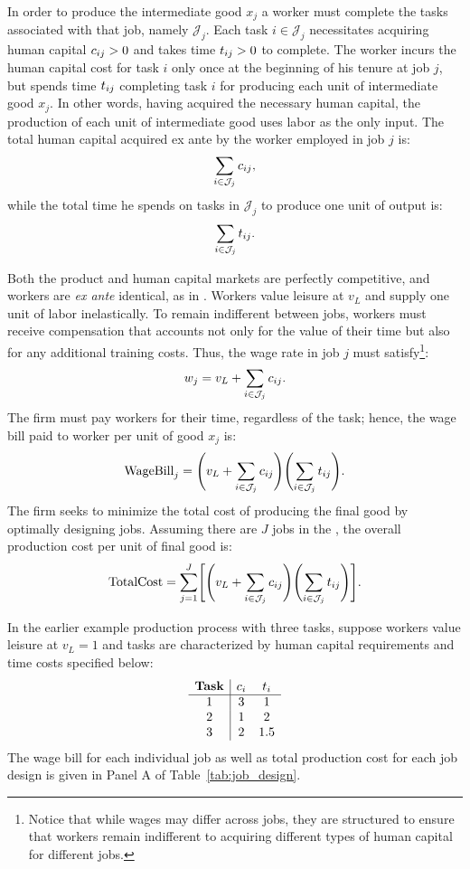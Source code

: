 \documentclass{article}
\theoremstyle{plain}
\theoremstyle{plain}
\begin{document}
In order to produce the intermediate good $x_j$ a worker must complete the tasks associated with that job, namely $\mathcal{J}_j$.
Each task $i \in \mathcal{J}_j$ necessitates acquiring human capital $c_{ij} > 0$ and takes time $t_{ij} > 0$ to complete.
The worker incurs the human capital cost for task $i$ only once at the beginning of his tenure at job $j$, but spends time $t_{ij}$ completing task $i$ for producing each unit of intermediate good $x_j$. 
In other words, having acquired the necessary human capital, the production of each unit of intermediate good uses labor as the only input.
The total human capital acquired ex ante by the worker employed in job $j$ is:
\[
\sum_{i \in \mathcal{J}_j} c_{ij},
\]
while the total time he spends on tasks in $\mathcal{J}_j$ to produce one unit of output is:
\[
\sum_{i \in \mathcal{J}_j} t_{ij}.
\]

Both the product and human capital markets are perfectly competitive, and workers are \emph{ex ante} identical, as in \cite{becker1992division}.
Workers value leisure at $v_L$ and supply one unit of labor inelastically.
To remain indifferent between jobs, workers must receive compensation that accounts not only for the value of their time but also for any additional training costs.
Thus, the wage rate in job $j$ must satisfy\footnote{Notice that while wages may differ across jobs, they are structured to ensure that workers remain indifferent to acquiring different types of human capital for different jobs.}:
\[
w_j = v_L + \sum_{i \in \mathcal{J}_j} c_{ij}.
\]
The firm must pay workers for their time, regardless of the task; hence, the wage bill paid to worker per unit of good $x_j$ is:
\[
\text{WageBill}_j = \Biggl(v_L + \sum_{i \in \mathcal{J}_j} c_{ij} \Biggr) \Biggl(\sum_{i \in \mathcal{J}_j} t_{ij} \Biggr).
\]
The firm seeks to minimize the total cost of producing the final good by optimally designing jobs.
Assuming there are $J$ jobs in the , the overall production cost per unit of final good is:
\[
\text{TotalCost} = \sum_{j=1}^J \Biggl[\Biggl(v_L + \sum_{i \in \mathcal{J}_j} c_{ij} \Biggr) \Biggl(\sum_{i \in \mathcal{J}_j} t_{ij} \Biggr)\Biggr].
\]

In the earlier example production process with three tasks, suppose workers value leisure at $v_L = 1$ and tasks are characterized by human capital requirements and time costs specified below:
\[
\begin{array}{c|ccc}
\textbf{Task} & c_{i} & t_{i} \\ \hline
1 & 3  & 1 \\
2 & 1 & 2  \\
3 & 2   & 1.5 \\
\end{array}
\]
The wage bill for each individual job as well as total production cost for each job design is given in Panel A of Table~\ref{tab:job_design}.
\end{document}
